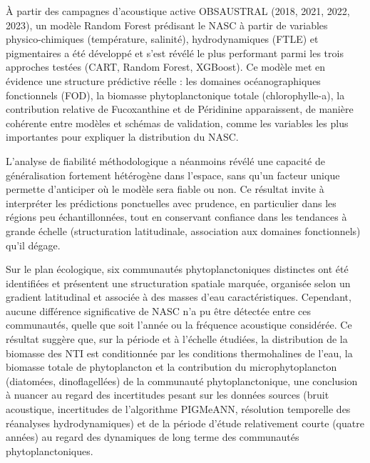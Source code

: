 \documentclass[11pt,a4paper,oneside]{report}
\begin{document}
	\vspace{0.3cm}
	
	À partir des campagnes d'acoustique active OBSAUSTRAL (2018, 2021, 2022, 2023), un modèle Random Forest prédisant le NASC à partir de variables physico-chimiques (température, salinité), hydrodynamiques (FTLE) et pigmentaires a été développé et s'est révélé le plus performant parmi les trois approches testées (CART, Random Forest, XGBoost). Ce modèle met en évidence une structure prédictive réelle : les domaines océanographiques fonctionnels (FOD), la biomasse phytoplanctonique totale (chlorophylle-a), la contribution relative de Fucoxanthine et de Péridinine apparaissent, de manière cohérente entre modèles et schémas de validation, comme les variables les plus importantes pour expliquer la distribution du NASC.
	
	\vspace{0.3cm}
	
	L'analyse de fiabilité méthodologique a néanmoins révélé une capacité de généralisation fortement hétérogène dans l'espace, sans qu'un facteur unique permette d'anticiper où le modèle sera fiable ou non. Ce résultat invite à interpréter les prédictions ponctuelles avec prudence, en particulier dans les régions peu échantillonnées, tout en conservant confiance dans les tendances à grande échelle (structuration latitudinale, association aux domaines fonctionnels) qu'il dégage.
	
	\vspace{0.3cm}
	
	Sur le plan écologique, six communautés phytoplanctoniques distinctes ont été identifiées et présentent une structuration spatiale marquée, organisée selon un gradient latitudinal et associée à des masses d'eau caractéristiques. Cependant, aucune différence significative de NASC n'a pu être détectée entre ces communautés, quelle que soit l'année ou la fréquence acoustique considérée. Ce résultat suggère que, sur la période et à l'échelle étudiées, la distribution de la biomasse des NTI est conditionnée par les conditions thermohalines de l'eau, la biomasse totale de phytoplancton et la contribution du microphytoplancton (diatomées, dinoflagellées) de la communauté phytoplanctonique, une conclusion à nuancer au regard des incertitudes pesant sur les données sources (bruit acoustique, incertitudes de l'algorithme PIGMeANN, résolution temporelle des réanalyses hydrodynamiques) et de la période d'étude relativement courte (quatre années) au regard des dynamiques de long terme des communautés phytoplanctoniques.
	
\end{document}
